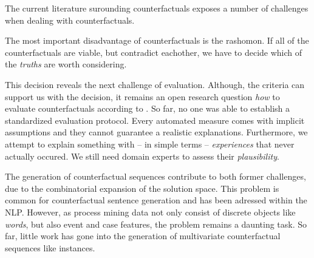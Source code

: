 \documentclass[./../../paper.tex]{subfiles}
\begin{document}
The current literature surounding counterfactuals exposes a number of challenges when dealing with counterfactuals.

The most important disadvantage of counterfactuals is the \gls{rashomon}\autocite[ch.9.3]{molnar2019}. If all of the counterfactuals are viable, but contradict eachother, we have to decide which of the \emph{truths} are worth considering.

This decision reveals the next challenge of evaluation. Although, the criteria can support us with the decision, it remains an open research question \emph{how} to evaluate counterfactuals according to \citeauthor{carvalho_MachineLearningInterpretability_2019}. So far, no one was able to establish a standardized evaluation protocol\autocite{hsieh_DiCE4ELInterpretingProcess_2021}. Every automated measure comes with implicit assumptions and they cannot guarantee a realistic explanations. Furthermore, we attempt to explain something with -- in simple terms -- \emph{experiences} that never actually occured. We still need domain experts to assess their \emph{plausibility}.

The generation of counterfactual sequences contribute to both former challenges, due to the combinatorial expansion of the solution space. This problem is common for counterfactual sentence generation and has been adressed within the \gls{NLP}. However, as process mining data not only consist of discrete objects like \emph{words}, but also event and case features, the problem remains a daunting task. So far, little work has gone into the generation of multivariate counterfactual sequences like \glspl{instance}.


\end{document}
